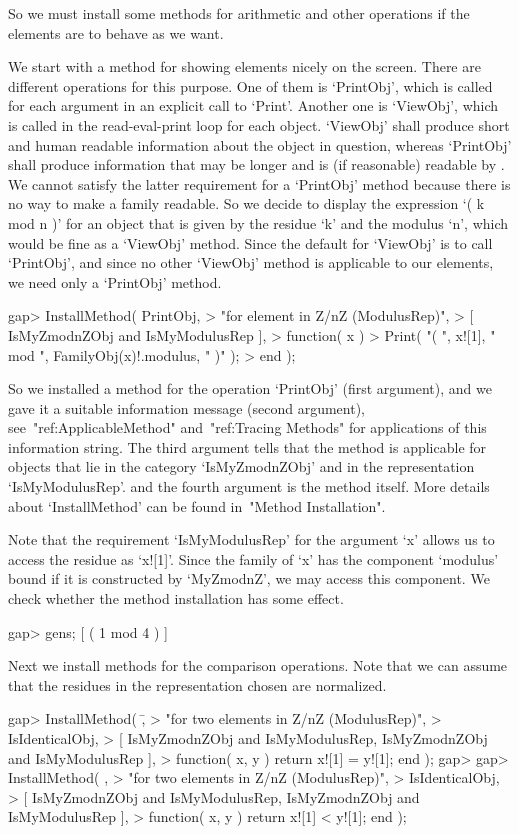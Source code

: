 So we must install some methods for arithmetic and other
operations if the elements are to behave as we want.

We start with a method for showing elements nicely on the screen.
There are different operations for this purpose.
One of them is `PrintObj', which is called for each argument in an
explicit call to `Print'.
Another one is `ViewObj', which is called in the read-eval-print loop
for each object.
`ViewObj' shall produce short and human readable information about the
object in question, whereas `PrintObj' shall produce information that
may be longer and is (if reasonable) readable by {\GAP}.
We cannot satisfy the latter requirement for a `PrintObj' method
because there is no way to make a family {\GAP} readable.
So we decide to display the expression `( k mod n )' for an object
that is given by the residue `k' and the modulus `n',
which would be fine as a `ViewObj' method.
Since the default for `ViewObj' is to call `PrintObj',
and since no other `ViewObj' method is applicable to our elements,
we need only a `PrintObj' method.

\beginexample
gap> InstallMethod( PrintObj,
>    "for element in Z/nZ (ModulusRep)",
>    [ IsMyZmodnZObj and IsMyModulusRep ],
>    function( x )
>    Print( "( ", x![1], " mod ", FamilyObj(x)!.modulus, " )" );
>    end );
\endexample

So we installed a method for the operation `PrintObj' (first argument),
and we gave it a suitable information message (second argument),
see~"ref:ApplicableMethod" and~"ref:Tracing Methods" for applications of
this information string.
The third argument tells {\GAP} that the method is applicable for
objects that lie in the category `IsMyZmodnZObj' and in the representation
`IsMyModulusRep'.
and the fourth argument is the method itself.
More details about `InstallMethod' can be found in~"Method Installation".

Note that the requirement `IsMyModulusRep' for the argument `x' allows us
to access the residue as `x![1]'.
Since the family of `x' has the component `modulus' bound if it is
constructed by `MyZmodnZ', we may access this component.
We check whether the method installation has some effect.

\beginexample
gap> gens;
[ ( 1 mod 4 ) ]
\endexample

Next we install methods for the comparison operations.
Note that we can assume that the residues in the representation chosen
are normalized.

\beginexample
gap> InstallMethod( \=,
>    "for two elements in Z/nZ (ModulusRep)",
>    IsIdenticalObj,
>    [ IsMyZmodnZObj and IsMyModulusRep, IsMyZmodnZObj and IsMyModulusRep ],
>    function( x, y ) return x![1] = y![1]; end );
gap> 
gap> InstallMethod( \<,
>    "for two elements in Z/nZ (ModulusRep)",
>    IsIdenticalObj,
>    [ IsMyZmodnZObj and IsMyModulusRep, IsMyZmodnZObj and IsMyModulusRep ],
>    function( x, y ) return x![1] < y![1]; end );
\endexample

